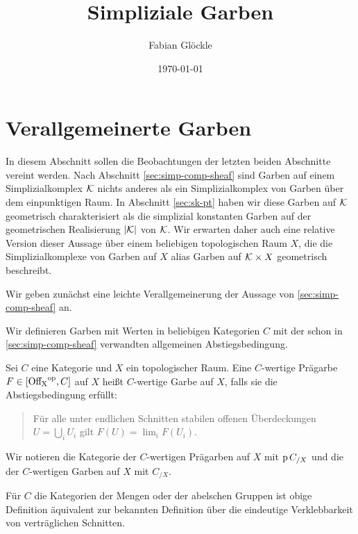 



\title{Simpliziale Garben}
\author{Fabian Glöckle}
\date{\today}

\chapter{Verallgemeinerte Garben}

In diesem Abschnitt sollen die Beobachtungen der letzten beiden
Abschnitte vereint werden. Nach Abschnitt
\autoref{sec:simp-comp-sheaf} sind Garben auf einem Simplizialkomplex
$\mathcal{K}$ nichts anderes als ein Simplizialkomplex von Garben über dem
einpunktigen Raum. In Abschnitt \autoref{sec:sk-pt} haben wir diese
Garben auf $\mathcal{K}$ geometrisch charakterisiert als die simplizial
konstanten Garben auf der geometrischen Realisierung $|\mathcal{K}|$ von
$\mathcal{K}$. Wir erwarten daher auch eine relative Version dieser Aussage
über einem beliebigen topologischen Raum $X$, die die
Simplizialkomplexe von Garben auf $X$ alias Garben auf $\mathcal{K} \times X$
geometrisch beschreibt.

Wir geben zunächst eine leichte Verallgemeinerung der Aussage von
\autoref{sec:simp-comp-sheaf} an.

Wir definieren Garben mit Werten in beliebigen Kategorien $C$ mit der
schon in \autoref{sec:simp-comp-sheaf} verwandten allgemeinen
Abstiegsbedingung.
\begin{defn}[\cite{TG}, 2.1.5]
  Sei $C$ eine Kategorie und $X$ ein topologischer Raum. Eine
  $C$-wertige Prägarbe $F \in [\operatorname{Off_X}^\mathrm{op}, C]$ auf $X$ heißt $C$-wertige
  Garbe auf $X$, falls sie die Abstiegsbedingung erfüllt:
  \begin{quote}
    Für alle unter endlichen Schnitten stabilen offenen Überdeckungen
    $U = \bigcup_i U_i$ gilt $F(U) = \lim_i F(U_i)$.
  \end{quote}
\end{defn}
Wir notieren die Kategorie der $C$-wertigen Prägarben auf $X$ mit $\operatorname{p}
C_{/X}$ und die der $C$-wertigen Garben auf $X$ mit $C_{/X}$.

Für $C$ die Kategorien der Mengen oder der abelschen Gruppen ist obige
Definition äquivalent zur bekannten Definition über die eindeutige
Verklebbarkeit von verträglichen Schnitten.

